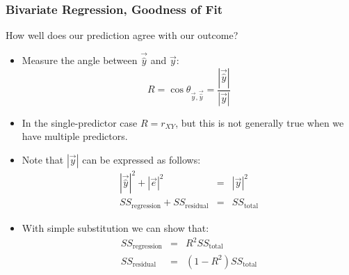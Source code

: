 \documentclass{beamer}
\begin{document}
\begin{frame}
  \frametitle{Bivariate Regression, Goodness of Fit}

How well does our prediction agree with our outcome?

\begin{itemize}
  \item Measure the angle between $\vec{\widehat{y}}$ and $\vec{y}$:
\[
R = \cos \theta_{\vec{y},\vec{\widehat{y}}} = \frac{|\vec{\widehat{y}}|}{|\vec{y}|}
\]

 \item In the single-predictor case $R = r_{XY}$, but this is not generally true when we have multiple predictors.

 \item Note that $|\vec{y}|$ can be expressed as follows:
\begin{eqnarray*}
|\vec{\widehat{y}}|^2 + |\vec{e}|^2 &=& |\vec{y}|^2 \\
SS_\mathrm{regression} + SS_\mathrm{residual} &=& SS_\mathrm{total}
\end{eqnarray*}

 \item With simple substitution we can show that:
\begin{eqnarray*}
SS_\mathrm{regression} &=& R^2 SS_\mathrm{total} \\
SS_\mathrm{residual} &=& (1-R^2)SS_\mathrm{total}
\end{eqnarray*}

\end{itemize}


\end{frame}
\end{document}
